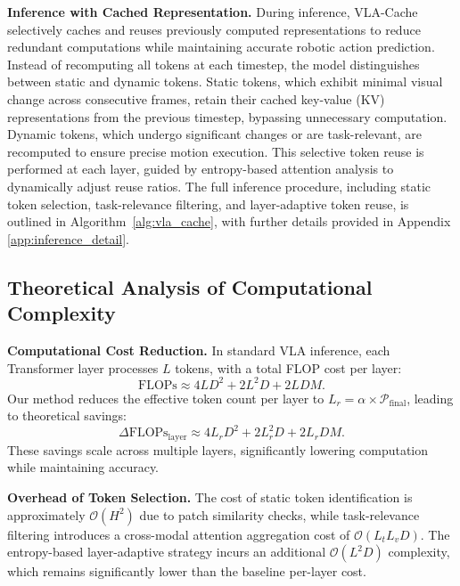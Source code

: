 \textbf{Inference with Cached Representation.}
During inference, VLA-Cache selectively caches and reuses previously computed representations to reduce redundant computations while maintaining accurate robotic action prediction. Instead of recomputing all tokens at each timestep, the model distinguishes between static and dynamic tokens. Static tokens, which exhibit minimal visual change across consecutive frames, retain their cached key-value (KV) representations from the previous timestep, bypassing unnecessary computation. Dynamic tokens, which undergo significant changes or are task-relevant, are recomputed to ensure precise motion execution. This selective token reuse is performed at each layer, guided by entropy-based attention analysis to dynamically adjust reuse ratios. The full inference procedure, including static token selection, task-relevance filtering, and layer-adaptive token reuse, is outlined in Algorithm~\ref{alg:vla_cache}, with further details provided in Appendix \ref{app:inference_detail}.


\subsection{Theoretical Analysis of Computational Complexity}

\noindent
\textbf{Computational Cost Reduction.} 
In standard VLA inference, each Transformer layer processes $L$ tokens, with a total FLOP cost per layer:
\begin{equation}
\label{eq:baseline_layer_flops}
\text{FLOPs} \approx 4 L D^2 + 2 L^2 D + 2 L D M.
\end{equation}
Our method reduces the effective token count per layer to $L_r = \alpha \times \mathcal{P}_{\mathrm{final}}$, leading to theoretical savings:
\begin{equation}
\label{eq:reuse_saving}
\Delta \text{FLOPs}_{\mathrm{layer}} \approx 4 L_r D^2 + 2 L_r^2 D + 2 L_r D M.
\end{equation}
These savings scale across multiple layers, significantly lowering computation while maintaining accuracy.

\noindent
\textbf{Overhead of Token Selection.} 
The cost of static token identification is approximately $\mathcal{O}(H^2)$ due to patch similarity checks, while task-relevance filtering introduces a cross-modal attention aggregation cost of $\mathcal{O}(L_t L_v D)$. The entropy-based layer-adaptive strategy incurs an additional $\mathcal{O}(L^2 D)$ complexity, which remains significantly lower than the baseline per-layer cost.

